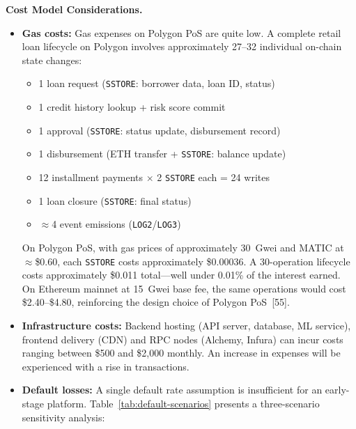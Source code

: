 \documentclass[12pt,a4paper]{report}
\begin{document}
\vspace{6pt}
\noindent\textbf{Cost Model Considerations.}

\begin{itemize}[noitemsep]
\item \textbf{Gas costs:} Gas expenses on Polygon PoS are quite low. A complete retail loan lifecycle on Polygon involves approximately 27--32 individual on-chain state changes:
\label{sec:gas-cost}
\begin{itemize}[noitemsep]
  \item 1 loan request (\texttt{SSTORE}: borrower data, loan ID, status)
  \item 1 credit history lookup + risk score commit
  \item 1 approval (\texttt{SSTORE}: status update, disbursement record)
  \item 1 disbursement (ETH transfer + \texttt{SSTORE}: balance update)
  \item 12 installment payments $\times$ 2 \texttt{SSTORE} each = 24 writes
  \item 1 loan closure (\texttt{SSTORE}: final status)
  \item $\approx$4 event emissions (\texttt{LOG2}/\texttt{LOG3})
\end{itemize}
On Polygon PoS, with gas prices of approximately 30~Gwei and MATIC at $\approx$\$0.60, each \texttt{SSTORE} costs approximately \$0.00036. A 30-operation lifecycle costs approximately \$0.011 total---well under 0.01\% of the interest earned. On Ethereum mainnet at 15~Gwei base fee, the same operations would cost \$2.40--\$4.80, reinforcing the design choice of Polygon PoS~[55].
\item \textbf{Infrastructure costs:} Backend hosting (API server, database, ML service), frontend delivery (CDN) and RPC nodes (Alchemy, Infura) can incur costs ranging between \$500 and \$2,000 monthly. An increase in expenses will be experienced with a rise in transactions.
\item \textbf{Default losses:} A single default rate assumption is insufficient for an early-stage platform. Table~\ref{tab:default-scenarios} presents a three-scenario sensitivity analysis:


\end{itemize}
\end{document}
